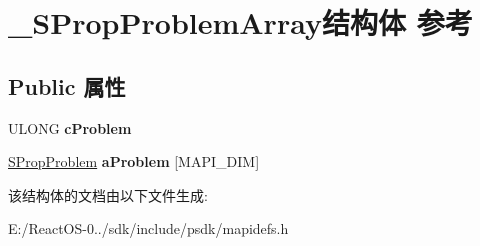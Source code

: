 \hypertarget{struct___s_prop_problem_array}{}\section{\+\_\+\+S\+Prop\+Problem\+Array结构体 参考}
\label{struct___s_prop_problem_array}
\subsection*{Public 属性}
\begin{DoxyCompactItemize}
\item 
\mbox{\label{struct___s_prop_problem_array_a662599b6f0cd379e27457f1d980409f9}} 
U\+L\+O\+NG {\bfseries c\+Problem}
\item 
\mbox{\label{struct___s_prop_problem_array_ac348b2cd710ac356ddd953048c0c3986}} 
\hyperlink{struct___s_prop_problem}{S\+Prop\+Problem} {\bfseries a\+Problem} \mbox{[}M\+A\+P\+I\+\_\+\+D\+IM\mbox{]}
\end{DoxyCompactItemize}


该结构体的文档由以下文件生成\+:\begin{DoxyCompactItemize}
\item 
E\+:/\+React\+O\+S-\/0../sdk/include/psdk/mapidefs.\+h\end{DoxyCompactItemize}
